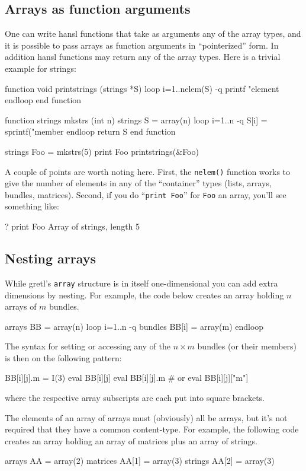 \subsection{Arrays as function arguments}
\label{subsec:array-args}

One can write hansl functions that take as arguments any of the array
types, and it is possible to pass arrays as function arguments in
``pointerized'' form. In addition hansl functions may return any of
the array types. Here is a trivial example for strings:
\begin{code}
function void printstrings (strings *S)
  loop i=1..nelem(S) -q
    printf "element %
  endloop
end function

function strings mkstrs (int n)
  strings S = array(n)
  loop i=1..n -q
    S[i] = sprintf("member %
  endloop
  return S
end function

strings Foo = mkstrs(5)
print Foo
printstrings(&Foo)
\end{code}

A couple of points are worth noting here. First, the \texttt{nelem()}
function works to give the number of elements in any of the
``container'' types (lists, arrays, bundles, matrices). Second, if you
do ``\texttt{print Foo}'' for \texttt{Foo} an array, you'll see
something like:
\begin{code}
? print Foo
Array of strings, length 5
\end{code}

\subsection{Nesting arrays}

While gretl's \texttt{array} structure is in itself one-dimensional
you can add extra dimensions by nesting. For example, the code below
creates an array holding $n$ arrays of $m$ bundles.
\begin{code}
arrays BB = array(n)
loop i=1..n -q
    bundles BB[i] = array(m)
endloop
\end{code}
The syntax for setting or accessing any of the $n \times m$ bundles
(or their members) is then on the following pattern:
\begin{code}
BB[i][j].m = I(3)
eval BB[i][j]
eval BB[i][j].m # or eval BB[i][j]["m"]
\end{code}
where the respective array subscripts are each put into square
brackets.

The elements of an array of arrays must (obviously) all be arrays, but
it's not required that they have a common content-type. For example,
the following code creates an array holding an array of matrices plus
an array of strings.
\begin{code}
arrays AA = array(2)
matrices AA[1] = array(3)
strings AA[2] = array(3)
\end{code}

